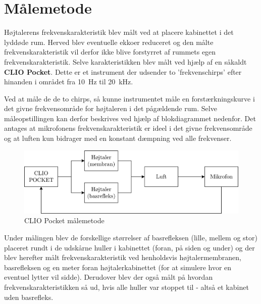 \chapter{Målemetode}
\label{ch:measurements}
Højtalerens frekvenskarakteristik blev målt ved at placere kabinettet i det lyddøde rum. Herved blev eventuelle ekkoer reduceret og den målte frekvenskarakteristik vil derfor ikke blive forstyrret af rummets egen frekvenskarakteristik. Selve karakteristikken blev målt ved hjælp af en såkaldt \textbf{CLIO Pocket}. Dette er et instrument der udsender to 'frekvenschirps' efter hinanden i området fra \SI{10}{\hertz} til \SI{20}{\kilo\hertz}.

Ved at måle de de to chirps, så kunne instrumentet måle en forstærkningskurve i det givne frekvensområde for højtaleren i det pågældende rum. Selve måleopstillingen kan derfor beskrives ved hjælp af blokdiagrammet nedenfor. Det antages at mikrofonens frekvenskarakteristik er ideel i det givne frekvensområde og at luften kun bidrager med en konstant dæmpning ved alle frekvenser. 
\begin{figure}[H]
	\centering
	\includegraphics[width=\textwidth]{Pics/CLIOFeedback}
	\caption{CLIO Pocket målemetode}
\end{figure}

Under målingen blev de forskellige størrelser af basrefleksen (lille, mellem og stor) placeret rundt i de udskårne huller i kabinettet (foran, på siden og under) og der blev herefter målt frekvenskarakteristik ved henholdsvis højtalermembranen, basrefleksen og en meter foran højtalerkabinettet (for at simulere hvor en eventuel lytter vil sidde). Derudover blev der også målt på hvordan frekvenskarakteristikken så ud, hvis alle huller var stoppet til - altså et kabinet uden basrefleks. 